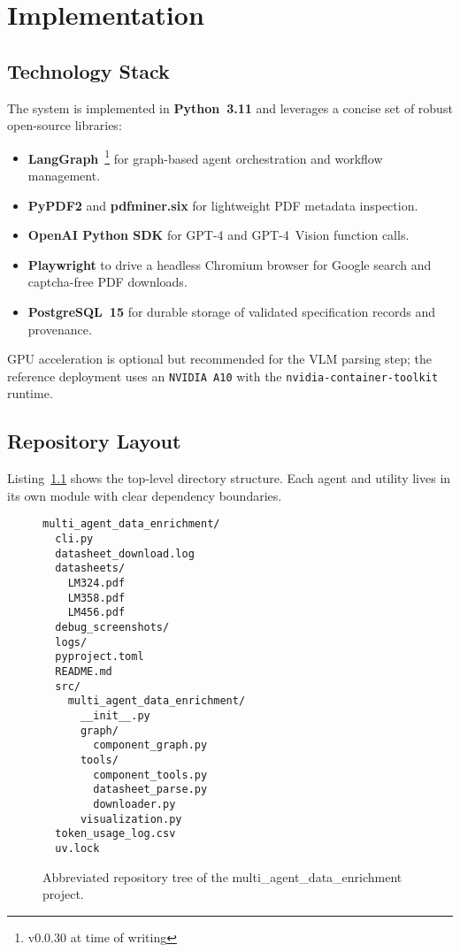 \chapter{Implementation}
\label{chapter:implementation}

\section{Technology Stack}
The system is implemented in \textbf{Python~3.11} and leverages a concise set of robust open-source libraries:
\begin{itemize}
  \item \textbf{LangGraph}~\footnote{v0.0.30 at time of writing} for graph-based agent orchestration and workflow management.
  \item \textbf{PyPDF2} and \textbf{pdfminer.six} for lightweight PDF metadata inspection.
  \item \textbf{OpenAI Python SDK} for GPT-4 and GPT-4~Vision function calls.
  \item \textbf{Playwright} to drive a headless Chromium browser for Google search and captcha-free PDF downloads.
  \item \textbf{PostgreSQL~15} for durable storage of validated specification records and provenance.
\end{itemize}
GPU acceleration is optional but recommended for the VLM parsing step; the reference deployment uses an \texttt{NVIDIA~A10} with the \texttt{nvidia-container-toolkit} runtime.

\section{Repository Layout}
Listing~\ref{lst:tree} shows the top-level directory structure.  Each agent and utility lives in its own module with clear dependency boundaries.
\begin{figure}[H]
\centering
\begin{minipage}{0.9\textwidth}
\begin{verbatim}
multi_agent_data_enrichment/
  cli.py
  datasheet_download.log
  datasheets/
    LM324.pdf
    LM358.pdf
    LM456.pdf
  debug_screenshots/
  logs/
  pyproject.toml
  README.md
  src/
    multi_agent_data_enrichment/
      __init__.py
      graph/
        component_graph.py
      tools/
        component_tools.py
        datasheet_parse.py
        downloader.py
      visualization.py
  token_usage_log.csv
  uv.lock
\end{verbatim}
\end{minipage}
\caption{Abbreviated repository tree of the multi\_agent\_data\_enrichment project.}
\label{lst:tree}
\end{figure}

